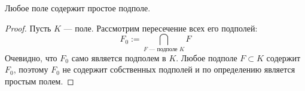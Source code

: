 \begin{Proposition}{}{}
	Любое поле содержит простое подполе.
\end{Proposition}

\begin{proof}
	Пусть $K$ --- поле. Рассмотрим пересечение всех его подполей:
	\[ F_0 := \bigcap_{F \text{ --- подполе } K} F \]
	Очевидно, что $F_0$ само является подполем в $K$. Любое подполе $F \subset K$ содержит $F_0$, поэтому $F_0$ не содержит собственных подполей и по определению является простым полем.
\end{proof}